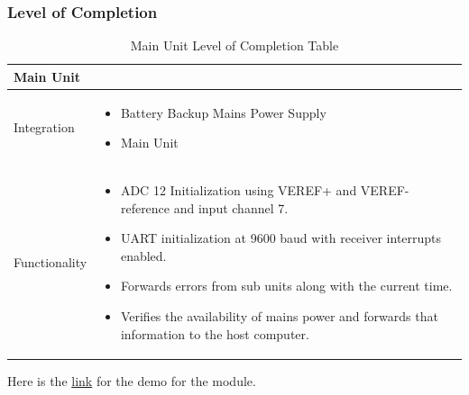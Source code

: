 \subsubsection{Level of Completion}
\begin{landscape}
  \begin{table}[!ht]
    \begin{tabularx}{\textwidth}{|X|X|}
      \hline
      \multicolumn{2}{|X|}{Main Unit}\\
      \hline
      Integration&\begin{itemize}
                    \item Battery Backup Mains Power Supply
                    \item Main Unit
                  \end{itemize}\\
                  \hline
      Functionality&\begin{itemize}
          \item ADC 12 Initialization using VEREF+ and VEREF- reference and input channel 7.
          \item UART initialization at 9600 baud with receiver interrupts enabled.
          \item Forwards errors from sub units along with the current time.
          \item Verifies the availability of mains power and forwards that information to the host computer.
        \end{itemize}\\
      \hline
    \end{tabularx}
    \caption{Main Unit Level of Completion Table}
    \label{tab:main-unit-modular-completion-table}
  \end{table}
\end{landscape}
Here is the \href{https://youtu.be/0NSB7EPtz0U}{link} for the demo for the module.
